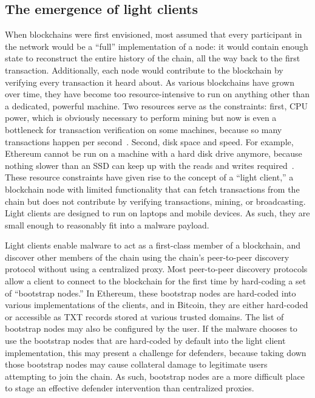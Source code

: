 \subsection{The emergence of light clients}

When blockchains were first envisioned, most assumed that every participant in 
the network would be a ``full'' implementation of a node: it would contain 
enough state to reconstruct the entire history of the chain, all the way back 
to the first transaction. Additionally, each node would contribute to the 
blockchain by verifying every transaction it heard about. As various 
blockchains have grown over time, they have become too resource-intensive to 
run on anything other than a dedicated, powerful machine. Two 
resources serve as 
the constraints: first, CPU power, which is obviously necessary to perform 
mining but now is even a bottleneck for transaction verification on some 
machines, because so many transactions happen per 
second~\cite{citation_needed}. Second, disk 
space and speed. For example, Ethereum cannot be run on a machine with a hard 
disk drive anymore, because nothing slower than an SSD can keep up with the 
reads and writes required~\cite{citation_needed}.  These resource constraints have 
given rise to the concept of a ``light client,'' a blockchain 
node with limited functionality that can fetch transactions 
from the chain but does not contribute by verifying 
transactions, mining, or broadcasting. Light clients are 
designed to run on laptops and mobile devices. As 
such, they are small enough to reasonably fit into a malware 
payload. 

Light clients enable malware to act as a first-class member 
of a blockchain, and discover other members of the chain 
using the chain's peer-to-peer discovery protocol without 
using a centralized proxy. Most peer-to-peer discovery 
protocols allow a client to connect to the blockchain for the 
first time by hard-coding a set of ``bootstrap nodes.'' In 
Ethereum, these bootstrap nodes are hard-coded into various 
implementations of the clients, and in Bitcoin, they are 
either hard-coded or accessible as TXT records stored at 
various trusted domains. The list of bootstrap nodes may also 
be configured by the user. If the 
malware chooses to use the bootstrap nodes that are 
hard-coded by default into the light client implementation, 
this may present a challenge for defenders, because taking 
down those bootstrap nodes may cause collateral damage to 
legitimate users attempting to join the chain. As such, 
bootstrap nodes are a more difficult place to stage an 
effective defender intervention than centralized proxies. 

